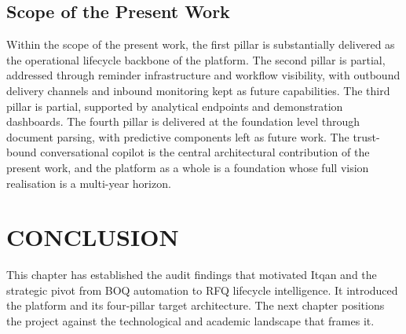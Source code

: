 \subsection{Scope of the Present Work}
Within the scope of the present work, the first pillar is substantially delivered as the operational lifecycle backbone of the platform. The second pillar is partial, addressed through reminder infrastructure and workflow visibility, with outbound delivery channels and inbound monitoring kept as future capabilities. The third pillar is partial, supported by analytical endpoints and demonstration dashboards. The fourth pillar is delivered at the foundation level through document parsing, with predictive components left as future work. The trust-bound conversational copilot is the central architectural contribution of the present work, and the platform as a whole is a foundation whose full vision realisation is a multi-year horizon.

\section*{CONCLUSION}
This chapter has established the audit findings that motivated Itqan and the strategic pivot from BOQ automation to RFQ lifecycle intelligence. It introduced the platform and its four-pillar target architecture. The next chapter positions the project against the technological and academic landscape that frames it.